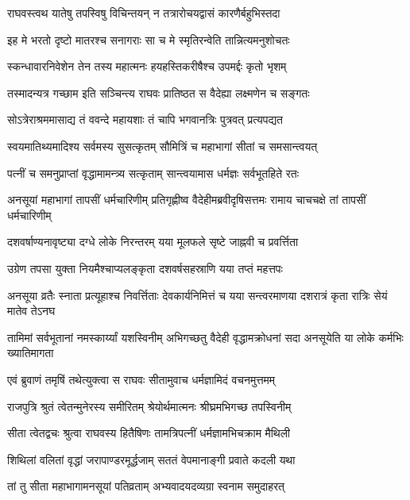 
\twolineshloka
{राघवस्त्वथ यातेषु तपस्विषु विचिन्तयन्}
{न तत्रारोचयद्वासं कारणैर्बहुभिस्तदा} %

\twolineshloka
{इह मे भरतो दृष्टो मातरश्च सनागराः}
{सा च मे स्मृतिरन्वेति तान्नित्यमनुशोचतः} %

\twolineshloka
{स्कन्धावारनिवेशेन तेन तस्य महात्मनः}
{हयहस्तिकरीषैश्च उपमर्द्दः कृतो भृशम्} %

\twolineshloka
{तस्मादन्यत्र गच्छाम इति सञ्चिन्त्य राघवः}
{प्रातिष्ठत स वैदेह्या लक्ष्मणेन च सङ्गतः} %

\twolineshloka
{सोऽत्रेराश्रममासाद्य तं ववन्दे महायशाः}
{तं चापि भगवानत्रिः पुत्रवत् प्रत्यपद्यत} %

\twolineshloka
{स्वयमातिथ्यमादिश्य सर्वमस्य सुसत्कृतम्}
{सौमित्रिं च महाभागां सीतां च समसान्त्वयत्} %

\twolineshloka
{पत्नीं च समनुप्राप्तां वृद्धामामन्त्र्य सत्कृताम्}
{सान्त्वयामास धर्मज्ञः सर्वभूतहिते रतः} %

\threelineshloka
{अनसूयां महाभागां तापसीं धर्मचारिणीम्}
{प्रतिगृह्णीष्व वैदेहीमब्रवीदृषिसत्तमः}
{रामाय चाचचक्षे तां तापसीं धर्मचारिणीम्} %

\twolineshloka
{दशवर्षाण्यनावृष्ट्या दग्धे लोके निरन्तरम्}
{यया मूलफले सृष्टे जाह्नवी च प्रवर्त्तिता} %

\twolineshloka
{उग्रेण तपसा युक्ता नियमैश्चाप्यलङ्कृता}
{दशवर्षसहस्राणि यया तप्तं महत्तपः} %

\threelineshloka
{अनसूया व्रतैः स्नाता प्रत्यूहाश्च निवर्त्तिताः}
{देवकार्यनिमित्तं च यया सन्त्वरमाणया}
{दशरात्रं कृता रात्रिः सेयं मातेव तेऽनघ} %

\threelineshloka
{तामिमां सर्वभूतानां नमस्कार्य्यां यशस्विनीम्}
{अभिगच्छतु वैदेही वृद्धामक्रोधनां सदा}
{अनसूयेति या लोके कर्मभिः ख्यातिमागता} %

\twolineshloka
{एवं ब्रुवाणं तमृषिं तथेत्युक्त्वा स राघवः}
{सीतामुवाच धर्मज्ञामिदं वचनमुत्तमम्} %

\twolineshloka
{राजपुत्रि श्रुतं त्वेतन्मुनेरस्य समीरितम्}
{श्रेयोर्थमात्मनः श्रीघ्रमभिगच्छ तपस्विनीम्} %

\twolineshloka
{सीता त्वेतद्वचः श्रुत्वा राघवस्य हितैषिणः}
{तामत्रिपत्नीं धर्मज्ञामभिचक्राम मैथिली} %

\twolineshloka
{शिथिलां वलितां वृद्धां जरापाण्डरमूर्द्धजाम्}
{सततं वेपमानाङ्गी प्रवाते कदली यथा} %

\twolineshloka
{तां तु सीता महाभागामनसूयां पतिव्रताम्}
{अभ्यवादयदव्यग्रा स्वनाम समुदाहरत्} %

